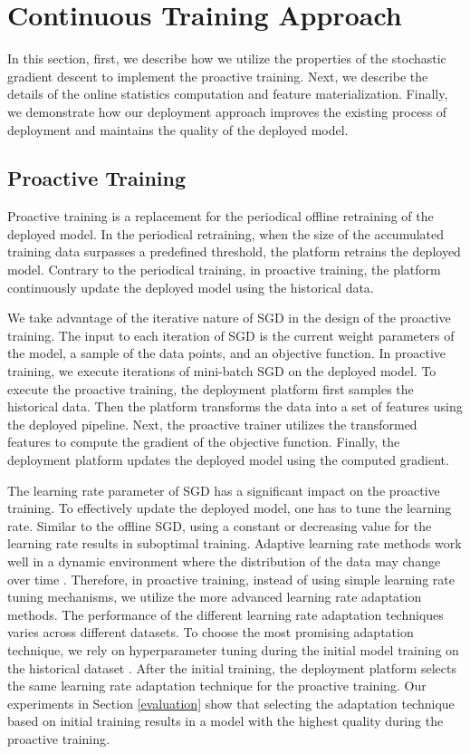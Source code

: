 \section{Continuous Training Approach} \label{continuous-training-serving}
In this section, first, we describe how we utilize the properties of the stochastic gradient descent to implement the proactive training.
Next, we describe the details of the online statistics computation and feature materialization.
Finally, we demonstrate how our deployment approach improves the existing process of deployment and maintains the quality of the deployed model.

\subsection{Proactive Training} \label{proactive-training}
Proactive training is a replacement for the periodical offline retraining of the deployed model.
In the periodical retraining, when the size of the accumulated training data surpasses a predefined threshold, the platform retrains the deployed model.
Contrary to the periodical training, in proactive training, the platform continuously update the deployed model using the historical data.

We take advantage of the iterative nature of SGD in the design of the proactive training.
The input to each iteration of SGD is the current weight parameters of the model, a sample of the data points, and an objective function.
In proactive training, we execute iterations of mini-batch SGD on the deployed model.
To execute the proactive training, the deployment platform first samples the historical data.
Then the platform transforms the data into a set of features using the deployed pipeline.
Next, the proactive trainer utilizes the transformed features to compute the gradient of the objective function.
Finally, the deployment platform updates the deployed model using the computed gradient.

The learning rate parameter of SGD has a significant impact on the proactive training.
To effectively update the deployed model, one has to tune the learning rate.
Similar to the offline SGD, using a constant or decreasing value for the learning rate results in suboptimal training.
Adaptive learning rate methods work well in a dynamic environment where the distribution of the data may change over time \cite{zeiler2012adadelta}.
Therefore, in proactive training, instead of using simple learning rate tuning mechanisms, we utilize the more advanced learning rate adaptation methods.
The performance of the different learning rate adaptation techniques varies across different datasets.
To choose the most promising adaptation technique, we rely on hyperparameter tuning during the initial model training on the historical dataset \cite{bergstra2012random}.
After the initial training, the deployment platform selects the same learning rate adaptation technique for the proactive training.
Our experiments in Section \ref{evaluation} show that selecting the adaptation technique based on initial training results in a model with the highest quality during the proactive training.

